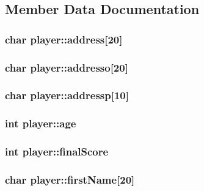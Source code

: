 \subsection{Member Data Documentation}
\hypertarget{structplayer_adda0593a31115af3d2fc7712b3c1ec06}{
\subsubsection[{address}]{\setlength{\rightskip}{0pt plus 5cm}char player\+::address\mbox{[}20\mbox{]}}}\label{structplayer_adda0593a31115af3d2fc7712b3c1ec06}
\hypertarget{structplayer_a0fc4babe259e876b9efc3467d40e5355}{
\subsubsection[{addresso}]{\setlength{\rightskip}{0pt plus 5cm}char player\+::addresso\mbox{[}20\mbox{]}}}\label{structplayer_a0fc4babe259e876b9efc3467d40e5355}
\hypertarget{structplayer_ae39f0c21bd9675a3ed588e27dd6e56b1}{
\subsubsection[{addressp}]{\setlength{\rightskip}{0pt plus 5cm}char player\+::addressp\mbox{[}10\mbox{]}}}\label{structplayer_ae39f0c21bd9675a3ed588e27dd6e56b1}
\hypertarget{structplayer_aacfd39287461fb570132e857307cff87}{
\subsubsection[{age}]{\setlength{\rightskip}{0pt plus 5cm}int player\+::age}}\label{structplayer_aacfd39287461fb570132e857307cff87}
\hypertarget{structplayer_a8ac3c82bb8b48293fd19a0e82771ed61}{
\subsubsection[{final\+Score}]{\setlength{\rightskip}{0pt plus 5cm}int player\+::final\+Score}}\label{structplayer_a8ac3c82bb8b48293fd19a0e82771ed61}
\hypertarget{structplayer_af5d399f16996f4710d7b1c443ef4937a}{
\subsubsection[{first\+Name}]{\setlength{\rightskip}{0pt plus 5cm}char player\+::first\+Name\mbox{[}20\mbox{]}}}\label{structplayer_af5d399f16996f4710d7b1c443ef4937a}
